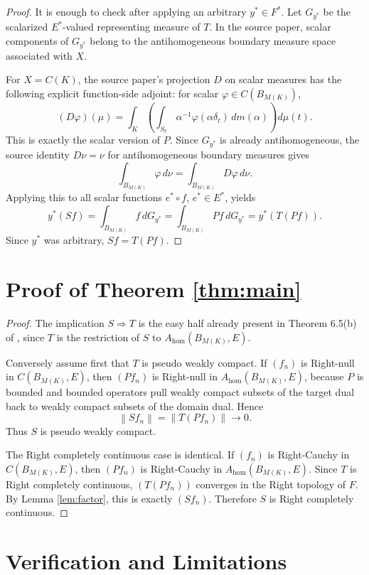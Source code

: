 \documentclass[11pt]{article}
\newcommand{\BM}{B_{M(K)}}
\newcommand{\SF}{S_{\mathbb F}}
\newcommand{\norm}[1]{\left\|#1\right\|}
\newcommand{\Ahom}{A_{\mathrm{hom}}}
\begin{document}
\begin{proof}
It is enough to check after applying an arbitrary \(y^*\in F^*\).  Let
\(G_{y^*}\) be the scalarized \(E^*\)-valued representing measure of \(T\).
In the source paper, scalar components of \(G_{y^*}\) belong to the
antihomogeneous boundary measure space associated with \(X\).

For \(X=C(K)\), the source paper's projection \(D\) on scalar measures has the
following explicit function-side adjoint: for scalar
\(\varphi\in C(\BM)\),
\[
  (D\varphi)(\mu)=
  \int_K\left(\int_{\SF}\alpha^{-1}\varphi(\alpha\delta_t)\,dm(\alpha)\right)
  d\mu(t).
\]
This is exactly the scalar version of \(P\).  Since \(G_{y^*}\) is already
antihomogeneous, the source identity \(D\nu=\nu\) for antihomogeneous boundary
measures gives
\[
  \int_{\BM} \varphi\,d\nu=\int_{\BM} D\varphi\,d\nu .
\]
Applying this to all scalar functions \(e^*\circ f\), \(e^*\in E^*\), yields
\[
  y^*(Sf)=\int_{\BM} f\,dG_{y^*}
          =\int_{\BM} Pf\,dG_{y^*}
          =y^*(T(Pf)).
\]
Since \(y^*\) was arbitrary, \(Sf=T(Pf)\).
\end{proof}

\section*{Proof of Theorem \ref{thm:main}}

\begin{proof}
The implication \(S\Rightarrow T\) is the easy half already present in
Theorem 6.5(b) of \cite{ondrej-spurny}, since \(T\) is the restriction of
\(S\) to \(\Ahom(\BM,E)\).

Conversely assume first that \(T\) is pseudo weakly compact.  If
\((f_n)\) is Right-null in \(C(\BM,E)\), then \((P f_n)\) is Right-null in
\(\Ahom(\BM,E)\), because \(P\) is bounded and bounded operators pull weakly
compact subsets of the target dual back to weakly compact subsets of the
domain dual.  Hence
\[
  \norm{S f_n}=\norm{T(Pf_n)}\to 0.
\]
Thus \(S\) is pseudo weakly compact.

The Right completely continuous case is identical.  If \((f_n)\) is
Right-Cauchy in \(C(\BM,E)\), then \((P f_n)\) is Right-Cauchy in
\(\Ahom(\BM,E)\).  Since \(T\) is Right completely continuous,
\((T(P f_n))\) converges in the Right topology of \(F\).  By Lemma
\ref{lem:factor}, this is exactly \((S f_n)\).  Therefore \(S\) is Right
completely continuous.
\end{proof}

\section*{Verification and Limitations}
\end{document}
